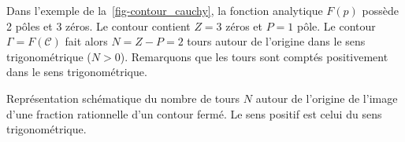 Dans l'exemple de la~\cref{fig-contour_cauchy}, la fonction analytique $F(p)$ 
possède 2 pôles et 3 zéros. Le contour contient $Z=3$ zéros et $P=1$ pôle.
Le contour $\Gamma=F(\mathcal{C})$ fait alors $N=Z-P=2$ tours autour 
de l'origine dans le sens trigonométrique ($N>0$). Remarquons que les tours 
sont comptés positivement dans le sens trigonométrique. %
\begin{marginfigure}
    \centering
    
%    
%
%    

    
%    
    \caption{Représentation schématique du nombre de tours $N$ autour de 
             l'origine de l'image d'une fraction rationnelle d'un contour 
             fermé. Le sens positif est celui du sens trigonométrique.
             \label{fig-ntours}}
\end{marginfigure}

